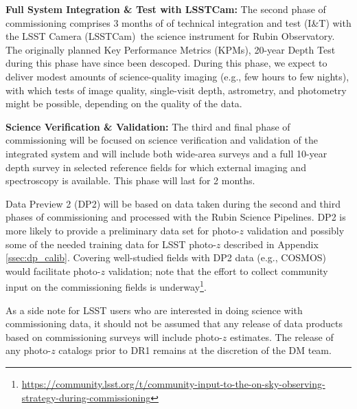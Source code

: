 \documentclass[DM,lsstdraft,toc]{lsstdoc}
\begin{document}
{\bf Full System Integration \& Test with LSSTCam:}
The second phase of commissioning comprises 3 months of of technical integration and test (I\&T) with  the LSST Camera (LSSTCam) \textemdash \,the science instrument for Rubin Observatory. 
The originally planned Key Performance Metrics (KPMs), 20-year Depth Test during this phase have since been descoped. 
During this phase, we expect to deliver modest amounts of science-quality imaging (e.g., few hours to few nights), with which tests of image quality, single-visit depth, astrometry, and photometry might be possible, depending on the quality of the data. 

{\bf Science Verification \& Validation:}
The third and final phase of commissioning will be focused on science verification and validation of the integrated system and will include both wide-area surveys and a full 10-year depth survey in selected reference fields for which external imaging and spectroscopy is available. 
This phase will last for 2 months. 

Data Preview 2 (DP2) will be based on data taken during the second and third phases of commissioning and processed with the Rubin Science Pipelines. 
DP2 is more likely to provide a preliminary data set for photo-$z$ validation and possibly some of the needed training data for LSST photo-$z$ described in Appendix \ref{ssec:dp_calib}. 
Covering well-studied fields with DP2 data (e.g., COSMOS) would facilitate photo-$z$ validation; note that the effort to collect community input on the commissioning fields is underway\footnote{\url{https://community.lsst.org/t/community-input-to-the-on-sky-observing-strategy-during-commissioning}}.

As a side note for LSST users who are interested in doing science with commissioning data, it should not be assumed that any release of data products based on commissioning surveys will include photo-$z$ estimates.
The release of any photo-$z$ catalogs prior to DR1 remains at the discretion of the DM team.

\clearpage


\clearpage
\appendix 
\end{document}
